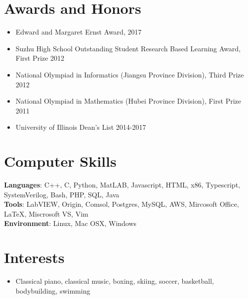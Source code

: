 \documentclass[hidelinks,letterpaper,11pt]{article} %
\newcommand{\resumeSubHeadingListStart}{\begin{itemize}[leftmargin=*]}
\newcommand{\resumeSubHeadingListEnd}{\end{itemize}}
\begin{document}
\section{Awards and Honors}
  \resumeSubHeadingListStart
    \item\small{ {Edward and Margaret Ernst Award, 2017 } \\ } \vspace{-2pt}
    \item\small{ {Suzhu High School Outstanding Student Research Based Learning Award, First Prize 2012} \\ } \vspace{-2pt}
    \item\small{ {National Olympiad in Informatics (Jiangsu Province Division), Third Prize 2012} \\ } \vspace{-2pt}
    \item\small{ {National Olympiad in Mathematics (Hubei Province Division), First Prize 2011} \\ } \vspace{-2pt}
    \item\small{ {University of Illinois Dean's List 2014-2017} \\ } \vspace{-4pt}
  \resumeSubHeadingListEnd

\section{Computer Skills}
\small{ \textbf{Languages}: C++, C, Python, MatLAB, Javascript, HTML, x86, Typescript, SystemVerilog, Bash, PHP, SQL, Java} \\
\small{ \textbf{Tools}: LabVIEW, Origin, Comsol, Postgres, MySQL, AWS, Mircosoft Office, LaTeX, Miscrosoft VS, Vim} \\
\small{ \textbf{Environment}: Linux, Mac OSX, Windows} \\

\section{Interests}
  \resumeSubHeadingListStart
      \item\small{
        {Classical piano, classical music, boxing, skiing, soccer, basketball, bodybuilding, swimming \vspace{-2pt}}
      }
  \resumeSubHeadingListEnd

%


\end{document}
